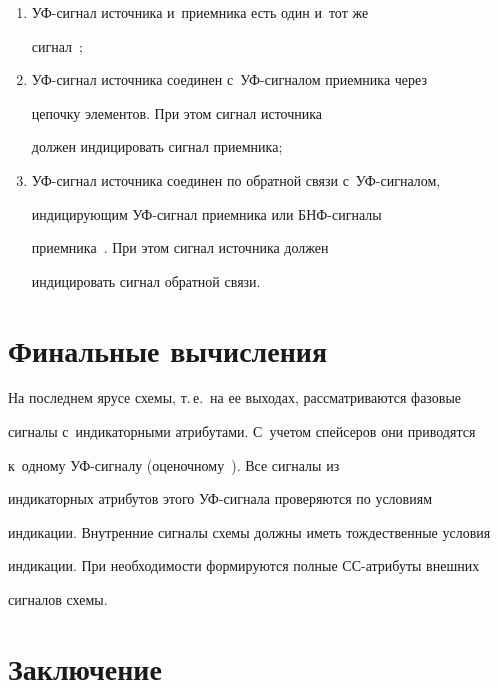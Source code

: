    \begin{enumerate}[(1)]


\item УФ-сигнал источника и~приемника есть один и~тот же 


сигнал~\cite[рис.~5.12]{5-ple};


\item УФ-сигнал источника соединен с~УФ-сигналом приемника через 


цепочку элементов\cite[рис.~5.13]{5-ple}. При этом сигнал источника 


должен индицировать сигнал приемника;


\item УФ-сигнал источника соединен по обратной связи с~УФ-сигналом, 


индицирующим УФ-сигнал приемника или БНФ-сигналы 


приемника~\cite[рис.~5.15]{5-ple}. При этом сигнал источника должен 


индицировать сигнал обратной связи.


\end{enumerate}





\section{Финальные вычисления}


       


   На последнем ярусе схемы, т.\,е.\ на ее выходах, рассматриваются фазовые 


сигналы с~индикаторными атрибутами. С~учетом спейсеров они приводятся 


к~одному УФ-сигналу (оценочному~\cite{5-ple}). Все сигналы из 


индикаторных атрибутов этого УФ-сигнала проверяются по условиям 


индикации. Внутренние сигналы схемы должны иметь тождественные условия 


индикации. При необходимости формируются полные СС-атрибуты внешних 


сигналов схемы.


   


\section{Заключение}


